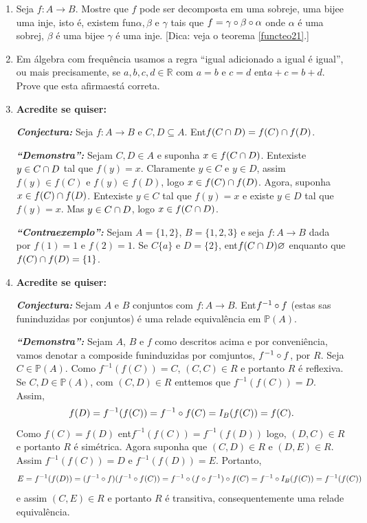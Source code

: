 \begin{enumerate}[{\bf 1.}]
\item Seja $f:A\to B$. Mostre que $f$ pode ser decomposta em uma sobreje\caoi, uma bije\cao e uma inje\caoi, isto \'e, existem fun\coes $\alpha, \beta$ e $\gamma$ tais que $f=\gamma\circ\beta\circ\alpha$ onde $\alpha$ \'e uma sobrej\caoi, $\beta$ \'e uma bije\cao e $\gamma$ \'e uma inje\caoi. [Dica: veja o teorema \ref{functeo21}.]

\item Em \'algebra com frequ\^encia usamos a regra ``igual adicionado a igual \'e igual'', ou mais precisamente, se $a,b,c,d\in\mathbb{R}$ com $a=b$ e $c=d$ ent\ao $a+c=b+d$. Prove que esta afirma\cao est\'a correta.

\item {\bf Acredite se quiser:}  

\noindent \textit{\textbf{Conjectura:}} Seja $f:A\to B$ e $C,D\subseteq A$. Ent\ao $f(C\cap D)=f(C)\cap f(D)$.

\noindent \textit{\textbf{``Demonstra\caoi'':}} Sejam $C,D\in A$ e suponha $x\in f(C\cap D)$. Ent\ao existe $y\in C\cap D$ tal que $f(y)=x$. Claramente $y\in C$ e $y\in D$, assim $f(y)\in f(C)$ e $f(y)\in f(D)$, logo $x\in f(C)\cap f(D)$. Agora, suponha $x\in f(C)\cap f(D)$. Ent\ao existe $y\in C$ tal que $f(y)=x$ e existe $y\in D$ tal que $f(y)=x$. Mas $y\in C\cap D$, logo $x\in f(C\cap D)$. 

\noindent \textit{\textbf{``Contraexemplo'':}} Sejam $A=\{1,2\}$, $B=\{1,2,3\}$ e seja $f:A\to B$ dada por $f(1)=1$ e $f(2)=1$. Se $C\{a\}$ e $D=\{2\}$, ent\ao $f(C\cap D)\varnothing$ enquanto que $f(C)\cap f(D)=\{1\}$. 

\item {\bf Acredite se quiser:}  

\noindent \textit{\textbf{Conjectura:}} Sejam $A$ e $B$ conjuntos com $f:A\to B$. Ent\ao $f^{-1}\circ f$ (estas s\ao as fun\coes induzidas por conjuntos) \'e uma rela\cao de equival\^encia em $\mathbb{P}(A)$.

\noindent \textit{\textbf{``Demonstra\caoi'':}} Sejam $A$, $B$ e $f$ como descritos acima e por conveni\^encia, vamos denotar a composi\cao de fun\coes induzidas por comjuntos, $f^{-1}\circ f$, por $R$. Seja $C\in \mathbb{P}(A)$. Como $f^{-1}(f(C))=C$, $(C,C)\in R$ e portanto $R$ \'e reflexiva. Se $C,D \in \mathbb{P}(A)$, com $(C,D)\in R$ ent\ao temos que $f^{-1}(f(C))=D$. Assim,
\[
f(D)=f^{-1}(f(C))=f^{-1}\circ f(C)=I_B(f(C))=f(C).
\]
Como $f(C)=f(D)$ ent\ao $f^{-1}(f(C))=f^{-1}(f(D))$ logo, $(D,C)\in R$ e portanto $R$ \'e sim\'etrica. Agora suponha que $(C,D)\in R$ e $(D,E)\in R$. Assim $f^{-1}(f(C))=D$ e $f^{-1}(f(D))=E$. Portanto,
\[
E=f^{-1}(f(D))= (f^{-1}\circ f)(f^{-1}\circ f(C))=f^{-1}\circ (f\circ f^{-1})\circ f(C)=f^{-1}\circ I_B(f(C))=f^{-1}(f(C))
\]
e assim $(C,E)\in R$ e portanto $R$ \'e transitiva, consequentemente uma rela\cao de equival\^encia.


\end{enumerate}
